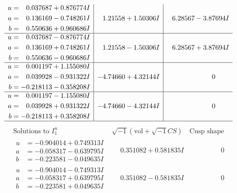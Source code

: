\documentclass[1p]{elsarticle_modified}
\theoremstyle{definition}
\newcommand{\I}{\sqrt{-1}}
\begin{document}
$$\begin{array}{c|c|c}
\begin{aligned}
u &= \phantom{-}0.037687 + 0.876774 I \\
a &= \phantom{-}0.136169 - 0.748261 I \\
b &= \phantom{-}0.550636 + 0.960686 I\end{aligned}
 & \phantom{-}1.21558 + 1.50306 I & \phantom{-}6.28567 - 3.87694 I \\ \hline\begin{aligned}
u &= \phantom{-}0.037687 - 0.876774 I \\
a &= \phantom{-}0.136169 + 0.748261 I \\
b &= \phantom{-}0.550636 - 0.960686 I\end{aligned}
 & \phantom{-}1.21558 - 1.50306 I & \phantom{-}6.28567 + 3.87694 I \\ \hline\begin{aligned}
u &= \phantom{-}0.001197 + 1.155080 I \\
a &= \phantom{-}0.039928 - 0.931322 I \\
b &= -0.218113 - 0.358208 I\end{aligned}
 & -4.74660 + 4.32144 I & \phantom{-0.000000 } 0 \\ \hline\begin{aligned}
u &= \phantom{-}0.001197 - 1.155080 I \\
a &= \phantom{-}0.039928 + 0.931322 I \\
b &= -0.218113 + 0.358208 I\end{aligned}
 & -4.74660 - 4.32144 I & \phantom{-0.000000 } 0\\
 \hline 
 \end{array}$$\newpage$$\begin{array}{c|c|c}  
\text{Solutions to }I^u_{1}& \I (\text{vol} + \sqrt{-1}CS) & \text{Cusp shape}\\
 \hline 
\begin{aligned}
u &= -0.904014 + 0.749313 I \\
a &= -0.058317 - 0.639795 I \\
b &= -0.223581 - 0.049635 I\end{aligned}
 & \phantom{-}0.351082 + 0.581835 I & \phantom{-0.000000 } 0 \\ \hline\begin{aligned}
u &= -0.904014 - 0.749313 I \\
a &= -0.058317 + 0.639795 I \\
b &= -0.223581 + 0.049635 I\end{aligned}
 & \phantom{-}0.351082 - 0.581835 I & \phantom{-0.000000 } 0 \\ \hline\begin{aligned}

\end{aligned}
\end{array}$$
\end{document}

